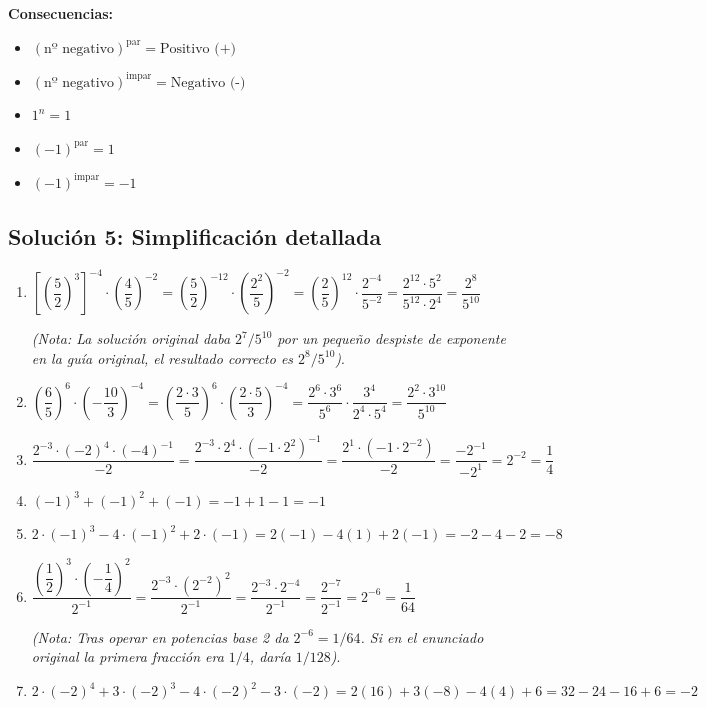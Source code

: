 \documentclass[a4paper,12pt]{article}
\begin{document}
\vspace{0.5cm}

\textbf{Consecuencias:}
\begin{itemize}
    \item $(\text{nº negativo})^{\text{par}} = \text{Positivo (+)}$
    \item $(\text{nº negativo})^{\text{impar}} = \text{Negativo (-)}$
    \item $1^{n} = 1$
    \item $(-1)^{\text{par}} = 1$
    \item $(-1)^{\text{impar}} = -1$
\end{itemize}

\subsection*{Solución 5: Simplificación detallada}

\begin{enumerate}[label=\alph*)]
    \item $\left[\left(\dfrac{5}{2}\right)^{3}\right]^{-4} \cdot \left(\dfrac{4}{5}\right)^{-2} = \left(\dfrac{5}{2}\right)^{-12} \cdot \left(\dfrac{2^{2}}{5}\right)^{-2} = \left(\dfrac{2}{5}\right)^{12} \cdot \dfrac{2^{-4}}{5^{-2}} = \dfrac{2^{12} \cdot 5^{2}}{5^{12} \cdot 2^{4}} = \dfrac{2^{8}}{5^{10}}$ 
    
    \textit{(Nota: La solución original daba $2^{7}/5^{10}$ por un pequeño despiste de exponente en la guía original, el resultado correcto es $2^8 / 5^{10}$)}.

    \item $\left(\dfrac{6}{5}\right)^{6} \cdot \left(-\dfrac{10}{3}\right)^{-4} = \left(\dfrac{2 \cdot 3}{5}\right)^{6} \cdot \left(\dfrac{2 \cdot 5}{3}\right)^{-4} = \dfrac{2^{6} \cdot 3^{6}}{5^{6}} \cdot \dfrac{3^{4}}{2^{4} \cdot 5^{4}} = \dfrac{2^{2} \cdot 3^{10}}{5^{10}}$

    \item $\dfrac{2^{-3} \cdot (-2)^{4} \cdot (-4)^{-1}}{-2} = \dfrac{2^{-3} \cdot 2^{4} \cdot (-1 \cdot 2^{2})^{-1}}{-2} = \dfrac{2^{1} \cdot (-1 \cdot 2^{-2})}{-2} = \dfrac{-2^{-1}}{-2^{1}} = 2^{-2} = \dfrac{1}{4}$

    \item $(-1)^{3} + (-1)^{2} + (-1) = -1 + 1 - 1 = -1$

    \item $2 \cdot (-1)^{3} - 4 \cdot (-1)^{2} + 2 \cdot (-1) = 2(-1) - 4(1) + 2(-1) = -2 - 4 - 2 = -8$

    \item $\dfrac{\left(\dfrac{1}{2}\right)^{3} \cdot \left(-\dfrac{1}{4}\right)^{2}}{2^{-1}} = \dfrac{2^{-3} \cdot (2^{-2})^{2}}{2^{-1}} = \dfrac{2^{-3} \cdot 2^{-4}}{2^{-1}} = \dfrac{2^{-7}}{2^{-1}} = 2^{-6} = \dfrac{1}{64}$
    
    \textit{(Nota: Tras operar en potencias base 2 da $2^{-6} = 1/64$. Si en el enunciado original la primera fracción era $1/4$, daría $1/128$)}.

    \item $2 \cdot (-2)^{4} + 3 \cdot (-2)^{3} - 4 \cdot (-2)^{2} - 3 \cdot (-2) = 2(16) + 3(-8) - 4(4) + 6 = 32 - 24 - 16 + 6 = -2$
\end{enumerate}
\end{document}
